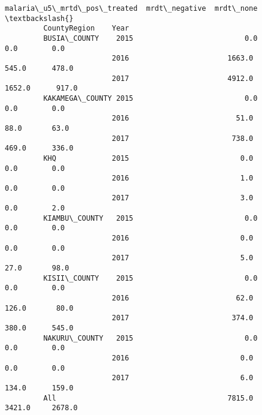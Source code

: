 \documentclass[11pt]{article}
\begin{document}
\begin{Verbatim}[commandchars=\\\{\}]
                               malaria\_u5\_mrtd\_pos\_treated  mrdt\_negative  mrdt\_none  \textbackslash{}
         CountyRegion    Year                                                          
         BUSIA\_COUNTY    2015                          0.0            0.0        0.0   
                         2016                       1663.0          545.0      478.0   
                         2017                       4912.0         1652.0      917.0   
         KAKAMEGA\_COUNTY 2015                          0.0            0.0        0.0   
                         2016                         51.0           88.0       63.0   
                         2017                        738.0          469.0      336.0   
         KHQ             2015                          0.0            0.0        0.0   
                         2016                          1.0            0.0        0.0   
                         2017                          3.0            0.0        2.0   
         KIAMBU\_COUNTY   2015                          0.0            0.0        0.0   
                         2016                          0.0            0.0        0.0   
                         2017                          5.0           27.0       98.0   
         KISII\_COUNTY    2015                          0.0            0.0        0.0   
                         2016                         62.0          126.0       80.0   
                         2017                        374.0          380.0      545.0   
         NAKURU\_COUNTY   2015                          0.0            0.0        0.0   
                         2016                          0.0            0.0        0.0   
                         2017                          6.0          134.0      159.0   
         All                                        7815.0         3421.0     2678.0   
         

\end{Verbatim}
\end{document}
